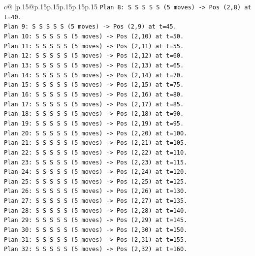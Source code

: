 \documentclass{article}
\begin{document}
{\begin{supertabular}{c@{$\;$}|p{.15\linewidth}@{}p{.15\linewidth}p{.15\linewidth}p{.15\linewidth}p{.15\linewidth}p{.15\linewidth}}
{{{\texttt{Plan 8: S S S S S (5 moves) {-}> Pos (2,8) at t=40.} \\
\texttt{Plan 9: S S S S S (5 moves) {-}> Pos (2,9) at t=45.} \\
\texttt{Plan 10: S S S S S (5 moves) {-}> Pos (2,10) at t=50.} \\
\texttt{Plan 11: S S S S S (5 moves) {-}> Pos (2,11) at t=55.} \\
\texttt{Plan 12: S S S S S (5 moves) {-}> Pos (2,12) at t=60.} \\
\texttt{Plan 13: S S S S S (5 moves) {-}> Pos (2,13) at t=65.} \\
\texttt{Plan 14: S S S S S (5 moves) {-}> Pos (2,14) at t=70.} \\
\texttt{Plan 15: S S S S S (5 moves) {-}> Pos (2,15) at t=75.} \\
\texttt{Plan 16: S S S S S (5 moves) {-}> Pos (2,16) at t=80.} \\
\texttt{Plan 17: S S S S S (5 moves) {-}> Pos (2,17) at t=85.} \\
\texttt{Plan 18: S S S S S (5 moves) {-}> Pos (2,18) at t=90.} \\
\texttt{Plan 19: S S S S S (5 moves) {-}> Pos (2,19) at t=95.} \\
\texttt{Plan 20: S S S S S (5 moves) {-}> Pos (2,20) at t=100.} \\
\texttt{Plan 21: S S S S S (5 moves) {-}> Pos (2,21) at t=105.} \\
\texttt{Plan 22: S S S S S (5 moves) {-}> Pos (2,22) at t=110.} \\
\texttt{Plan 23: S S S S S (5 moves) {-}> Pos (2,23) at t=115.} \\
\texttt{Plan 24: S S S S S (5 moves) {-}> Pos (2,24) at t=120.} \\
\texttt{Plan 25: S S S S S (5 moves) {-}> Pos (2,25) at t=125.} \\
\texttt{Plan 26: S S S S S (5 moves) {-}> Pos (2,26) at t=130.} \\
\texttt{Plan 27: S S S S S (5 moves) {-}> Pos (2,27) at t=135.} \\
\texttt{Plan 28: S S S S S (5 moves) {-}> Pos (2,28) at t=140.} \\
\texttt{Plan 29: S S S S S (5 moves) {-}> Pos (2,29) at t=145.} \\
\texttt{Plan 30: S S S S S (5 moves) {-}> Pos (2,30) at t=150.} \\
\texttt{Plan 31: S S S S S (5 moves) {-}> Pos (2,31) at t=155.} \\
\texttt{Plan 32: S S S S S (5 moves) {-}> Pos (2,32) at t=160.} \\
}}}
\end{supertabular}}
\end{document}
